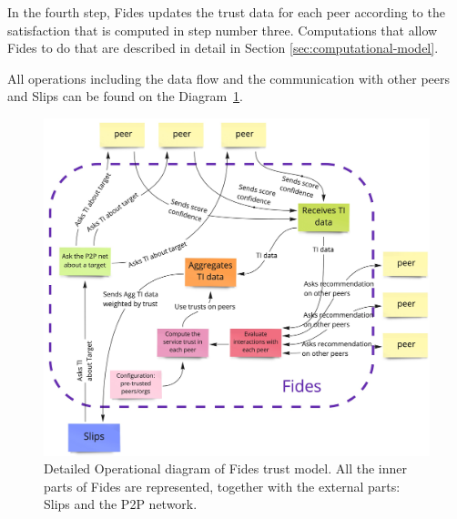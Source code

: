 In the fourth step, Fides updates the trust data for each peer according to the satisfaction that is computed in step number three.
Computations that allow Fides to do that are described in detail in Section \ref{sec:computational-model}.

All operations including the data flow and the communication with other peers and Slips can be found on the Diagram~\ref{fig:trust-model-operational-diagram}.

\begin{figure}[h]
    \centering
    \includegraphics[width=1.0\textwidth]{assets/fides_operational_diagram.jpeg}
    \caption{Detailed Operational diagram of Fides trust model. All the inner parts of Fides are represented, together with the external parts: Slips and the P2P network.}
    \label{fig:trust-model-operational-diagram}
\end{figure}